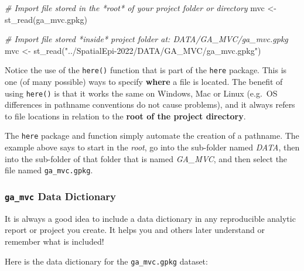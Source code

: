 \documentclass[
]{book}
\newenvironment{Shaded}{\begin{snugshade}}{\end{snugshade}}
\newcommand{\CommentTok}[1]{\textcolor[rgb]{0.56,0.35,0.01}{\textit{#1}}}
\newcommand{\FunctionTok}[1]{\textcolor[rgb]{0.00,0.00,0.00}{#1}}
\newcommand{\NormalTok}[1]{#1}
\newcommand{\OtherTok}[1]{\textcolor[rgb]{0.56,0.35,0.01}{#1}}
\newcommand{\StringTok}[1]{\textcolor[rgb]{0.31,0.60,0.02}{#1}}
\newenvironment{rmdtip}[1]
  {
  \begin{itemize}
  \renewcommand{\labelitemi}{
    \raisebox{-.7\height}[0pt][0pt]{
      {\setkeys{Gin}{width=3em,keepaspectratio}\texttt{[image: images/\#1]}}
    }
  }
  \setlength{\fboxsep}{1em}
  \begin{tip}
  \item
  }
  {
  \end{tip}
  \end{itemize}
  }
\begin{document}
\begin{Shaded}
\begin{Highlighting}[]
\CommentTok{\# Import file stored in the *root* of your project folder or directory}
\NormalTok{mvc }\OtherTok{\textless{}{-}} \FunctionTok{st\_read}\NormalTok{(}\StringTok{\textquotesingle{}ga\_mvc.gpkg\textquotesingle{}}\NormalTok{)}
\end{Highlighting}
\end{Shaded}

\begin{Shaded}
\begin{Highlighting}[]
\CommentTok{\# Import file stored *inside* project folder at: DATA/GA\_MVC/ga\_mvc.gpkg}
\NormalTok{mvc }\OtherTok{\textless{}{-}} \FunctionTok{st\_read}\NormalTok{(}\StringTok{"../SpatialEpi{-}2022/DATA/GA\_MVC/ga\_mvc.gpkg"}\NormalTok{)}
\end{Highlighting}
\end{Shaded}

\begin{rmdtip}{tip}
Notice the use of the \texttt{here()} function that is part of the \texttt{here} package. This is one (of many possible) ways to specify \textbf{where} a file is located. The benefit of using \texttt{here()} is that it works the same on Windows, Mac or Linux (e.g.~OS differences in pathname conventions do not cause problems), and it always refers to file locations in relation to the \textbf{root of the project directory}.

The \texttt{here} package and function simply automate the creation of a pathname. The example above says to start in the \emph{root}, go into the sub-folder named \emph{DATA}, then into the sub-folder of that folder that is named \emph{GA\_MVC}, and then select the file named \texttt{ga\_mvc.gpkg}.

\end{rmdtip}

\hypertarget{ga_mvc-data-dictionary}{%
\subsubsection{\texorpdfstring{\texttt{ga\_mvc} Data Dictionary}{ga\_mvc Data Dictionary}}\label{ga_mvc-data-dictionary}}

It is always a good idea to include a data dictionary in any reproducible analytic report or project you create. It helps you and others later understand or remember what is included!

Here is the data dictionary for the \texttt{ga\_mvc.gpkg} dataset:
\end{document}
